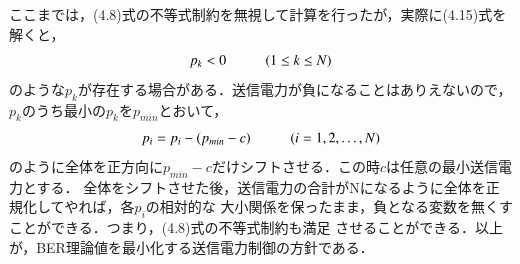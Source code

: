ここまでは，(4.8)式の不等式制約を無視して計算を行ったが，実際に(4.15)式を解くと，
\begin{equation}
    p_k < 0 \hspace{10mm} (1 \leq k \leq N)
\end{equation}
のような$p_k$が存在する場合がある．送信電力が負になることはありえないので，
$p_k$のうち最小の$p_k$を$p_{min}$とおいて，
\begin{equation}
    p_i = p_i-(p_{min}-c) \hspace{10mm} (i=1,2,\ldots,N)
\end{equation}
のように全体を正方向に$p_{min}-c$だけシフトさせる．この時$c$は任意の最小送信電力とする．
全体をシフトさせた後，送信電力の合計がNになるように全体を正規化してやれば，各$p_i$の相対的な
大小関係を保ったまま，負となる変数を無くすことができる．つまり，(4.8)式の不等式制約も満足
させることができる．以上が，BER理論値を最小化する送信電力制御の方針である．

